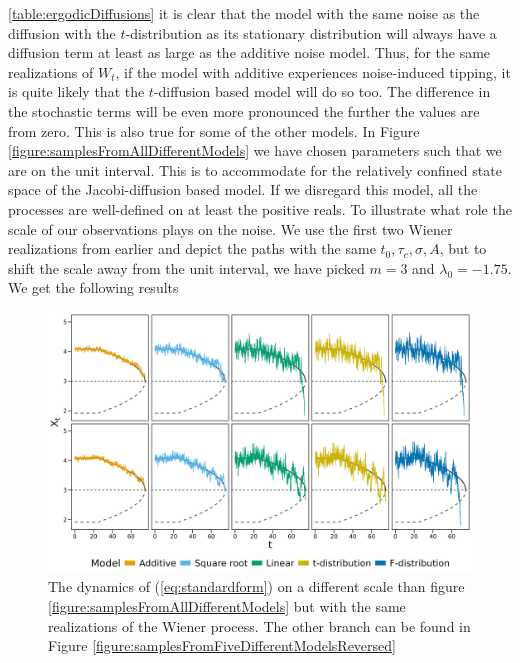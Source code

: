\ref{table:ergodicDiffusions} it is clear that the model with the same noise as the diffusion with the $t$-distribution as its stationary distribution will always have a diffusion term at least as large as the additive noise model. Thus, for the same realizations of $W_t$, if the model with additive experiences noise-induced tipping, it is quite likely that the $t$-diffusion based model will do so too. The difference in the stochastic terms will be even more pronounced the further the values are from zero. This is also true for some of the other models. In Figure \ref{figure:samplesFromAllDifferentModels} we have chosen parameters such that we are on the unit interval. This is to accommodate for the relatively confined state space of the Jacobi-diffusion based model. If we disregard this model, all the processes are well-defined on at least the positive reals. To illustrate what role the scale of our observations plays on the noise. We use the first two Wiener realizations from earlier and depict the paths with the same $t_0, \tau_c, \sigma, A$, but to shift the scale away from the unit interval, we have picked $m = 3$ and $\lambda_0 = -1.75$. We get the following results
\begin{figure}[h]
    \begin{center}
        \includegraphics[scale = .075]{figures/sample_paths_plot_big_scale.jpeg}
        \caption{The dynamics of (\ref{eq:standardform}) on a different scale than figure \ref{figure:samplesFromAllDifferentModels} but with the same realizations of the Wiener process. The other branch can be found in Figure \ref{figure:samplesFromFiveDifferentModelsReversed}}
        \label{figure:samplesFromFiveDifferentModels}
    \end{center}
\end{figure}\\
